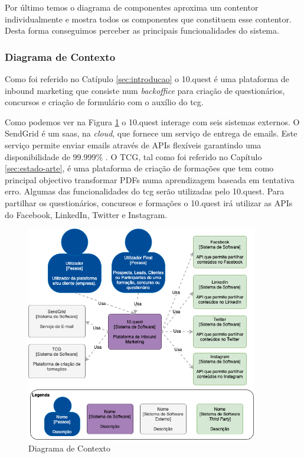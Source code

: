Por último temos o diagrama de componentes aproxima um contentor individualmente e mostra todos os componentes que constituem esse contentor. Desta forma conseguimos perceber as principais funcionalidades do sistema. 


\subsubsection{Diagrama de Contexto}

Como foi referido no Catípulo \ref{sec:introducao} o 10.quest é uma plataforma de inbound marketing que consiste num \textit{backoffice} para criação de questionários, concursos e criação de formulário com o auxílio do \acrshort{tcg}.

Como podemos ver na Figura \ref{fig:arq-contexto} o 10.quest interage com seis sistemas externos. O SendGrid\cite{sg} é um \acrshort{saas}, na \textit{cloud}, que fornece um serviço de entrega de emails. Este serviço permite enviar emails através de APIs flexíveis garantindo uma disponibilidade  de 99.999\% \cite{sguptime}. 
O TCG, tal como foi referido no Capítulo \ref{sec:estado-arte}, é uma plataforma de criação de formações que tem como principal objectivo transformar PDFs numa aprendizagem baseada em tentativa erro. Algumas das funcionalidades do \acrshort{tcg} serão utilizadas pelo 10.quest.
Para partilhar os questionários, concursos e formações o 10.quest irá utilizar as APIs do Facebook, LinkedIn, Twitter e Instagram.


\newpage

\begin{figure}[ht!]
	\begin{center}
		\includegraphics[width=0.9\textwidth]{img/arq/diagrama-contexto}
		\caption{Diagrama de Contexto}
		\label{fig:arq-contexto}
	\end{center}
\end{figure}

